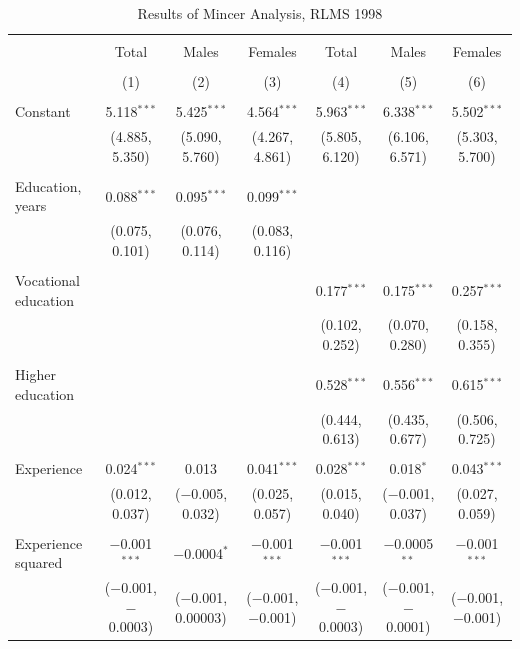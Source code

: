 \documentclass[alpha-refs]{wiley-article-01g}
\begin{document}
\begin{landscape}

\fontsize{9}{11}
\selectfont

\begin{table}[!htbp] \centering 
\renewcommand{\arraystretch}{1.0}
  \caption{Results of Mincer Analysis, RLMS 1998} 
  \label{} 
\begin{tabular}{@{\extracolsep{5pt}}lcccccc} 
\\[-.8ex]\hline 
\hline \\[-.8ex] 
 & Total & Males & Females & Total & Males & Females \\ 
\\[-.8ex] & (1) & (2) & (3) & (4) & (5) & (6)\\ 
\hline \\[-.8ex] 
 Constant & 5.118$^{***}$ & 5.425$^{***}$ & 4.564$^{***}$ & 5.963$^{***}$ & 6.338$^{***}$ & 5.502$^{***}$ \\ 
  & (4.885, 5.350) & (5.090, 5.760) & (4.267, 4.861) & (5.805, 6.120) & (6.106, 6.571) & (5.303, 5.700) \\ 
  & & & & & & \\ 
 Education, years & 0.088$^{***}$ & 0.095$^{***}$ & 0.099$^{***}$ &  &  &  \\ 
  & (0.075, 0.101) & (0.076, 0.114) & (0.083, 0.116) &  &  &  \\ 
  & & & & & & \\ 
 Vocational education &  &  &  & 0.177$^{***}$ & 0.175$^{***}$ & 0.257$^{***}$ \\ 
  &  &  &  & (0.102, 0.252) & (0.070, 0.280) & (0.158, 0.355) \\ 
  & & & & & & \\ 
 Higher education &  &  &  & 0.528$^{***}$ & 0.556$^{***}$ & 0.615$^{***}$ \\ 
  &  &  &  & (0.444, 0.613) & (0.435, 0.677) & (0.506, 0.725) \\ 
  & & & & & & \\ 
 Experience & 0.024$^{***}$ & 0.013 & 0.041$^{***}$ & 0.028$^{***}$ & 0.018$^{*}$ & 0.043$^{***}$ \\ 
  & (0.012, 0.037) & ($-$0.005, 0.032) & (0.025, 0.057) & (0.015, 0.040) & ($-$0.001, 0.037) & (0.027, 0.059) \\ 
  & & & & & & \\ 
 Experience squared & $-$0.001$^{***}$ & $-$0.0004$^{*}$ & $-$0.001$^{***}$ & $-$0.001$^{***}$ & $-$0.0005$^{**}$ & $-$0.001$^{***}$ \\ 
  & ($-$0.001, $-$0.0003) & ($-$0.001, 0.00003) & ($-$0.001, $-$0.001) & ($-$0.001, $-$0.0003) & ($-$0.001, $-$0.0001) & ($-$0.001, $-$0.001) \\ 

\end{tabular}
\end{table}
\end{landscape}
\end{document}
